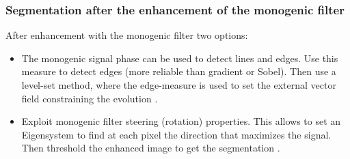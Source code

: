 \documentclass[9pt]{beamer}
\begin{document}
\begin{frame}[t]
  \frametitle{Segmentation after the enhancement of the monogenic filter}
     After enhancement with the monogenic filter two options:
     \begin{itemize}
       \item The monogenic signal phase can be used to detect lines and edges. Use this measure to detect edges (more reliable than gradient or Sobel). Then use a level-set method, where the edge-measure is used to set the external vector field constraining the evolution \citep{rajpoot_local-phase_2009}.
       \item Exploit monogenic filter steering (rotation) properties. This allows to set an Eigensystem to find at each pixel the direction that maximizes the signal. Then threshold the enhanced image to get the segmentation \citep{chenouard_3d_2011}.
     \end{itemize}
\end{frame}
\end{document}
